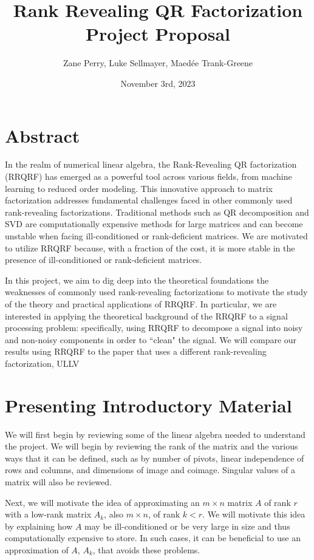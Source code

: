 \documentclass[10pt]{article}
\title{Rank Revealing QR Factorization Project Proposal}
\author{Zane Perry, Luke Sellmayer, Maed\'ee Trank-Greene}
\date{November 3rd, 2023}
\begin{document}
\maketitle

\section{Abstract}
In the realm of numerical linear algebra, the Rank-Revealing QR factorization (RRQRF) has emerged as a powerful tool across various fields, from machine learning to reduced order modeling. This innovative approach to matrix factorization addresses fundamental challenges faced in other commonly used rank-revealing factorizations. Traditional methods such as QR decomposition and SVD are computationally expensive methods for large matrices and can become unstable when facing ill-conditioned or rank-deficient matrices. We are motivated to utilize RRQRF because, with a fraction of the cost, it is more stable in the presence of ill-conditioned or rank-deficient matrices.

In this project, we aim to dig deep into the theoretical foundations the weaknesses of commonly used rank-revealing factorizations to motivate the study of the theory and practical applications of RRQRF. In particular, we are interested in applying the theoretical background of the RRQRF to a signal processing problem: specifically, using RRQRF to decompose a signal into noisy and non-noisy components in order to ``clean" the signal. We will compare our results using RRQRF to the paper that uses a different rank-revealing factorization, ULLV \cite{7083201}

\section{Presenting Introductory Material}
We will first begin by reviewing some of the linear algebra needed to understand the project. We will begin by reviewing the rank of the matrix and the various ways that it can be defined, such as by number of pivots, linear independence of rows and columns, and dimensions of image and coimage. Singular values of a matrix will also be reviewed.

Next, we will motivate the idea of approximating an $m \times n$ matrix $A$ of rank $r$ with a low-rank matrix $A_k$, also $m \times n$, of rank $k < r$. We will motivate this idea by explaining how $A$ may be ill-conditioned or be very large in size and thus computationally expensive to store. In such cases, it can be beneficial to use an approximation of $A$, $A_k$, that avoids these problems. 
\end{document}
